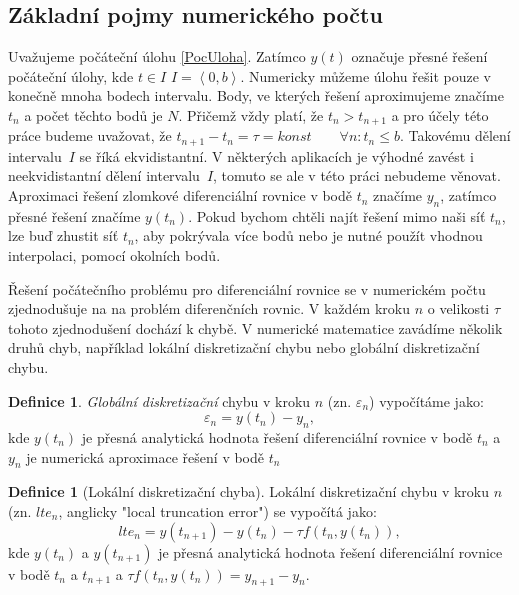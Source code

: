 \documentclass[a4paper,12pt,twoside]{article}
\theoremstyle{definition}
\newtheorem{defin}[veta]{Definice}
\theoremstyle{remark}
\numberwithin{equation}{section}
\numberwithin{table}{section}
\numberwithin{figure}{section}
\begin{document}
\subsection{Základní pojmy numerického počtu}
Uvažujeme počáteční úlohu \ref{PocUloha}. Zatímco $y\left(t\right)$ označuje přesné řešení počáteční úlohy, kde $t \in I$ $I = \left\langle0, b\right\rangle$. Numericky můžeme úlohu řešit pouze v konečně mnoha bodech intervalu. Body, ve kterých řešení aproximujeme značíme $t_n$ a počet těchto bodů je $N$. Přičemž vždy platí, že $t_n > t_{n+1}$ a pro účely této práce budeme uvažovat, že $t_{n+1} - t_n = \tau = konst \qquad \forall n: t_n \leq b$. Takovému dělení intervalu~$I$ se říká ekvidistantní. V některých aplikacích je výhodné zavést i neekvidistantní dělení intervalu~$I$, tomuto se ale v této práci nebudeme věnovat.
Aproximaci řešení zlomkové diferenciální rovnice v bodě $t_n$ značíme $y_n$, zatímco přesné řešení značíme $y\left(t_n\right)$. Pokud bychom chtěli najít řešení mimo naši síť $t_n$, lze buď zhustit síť $t_n$, aby pokrývala více bodů nebo je nutné použít vhodnou interpolaci, pomocí okolních bodů.

Řešení počátečního problému pro diferenciální rovnice se v numerickém počtu zjednodušuje na na problém diferenčních rovnic. V každém kroku $n$ o velikosti $\tau$ tohoto zjednodušení dochází k chybě. V numerické matematice zavádíme několik druhů chyb, například lokální diskretizační chybu nebo globální diskretizační chybu. %

\begin{defin}\label{GlobalniDiskretizacniChyba}
	\textit{Globální diskretizační} chybu v kroku $n$ (zn. $\varepsilon_{n}$) vypočítáme jako:
	$$\varepsilon_{n} = y\left(t_{n}\right) - y_{n},$$
	kde $y\left(t_{n}\right)$ je přesná analytická hodnota řešení diferenciální rovnice v bodě $t_{n}$ a $y_{n}$ je numerická aproximace řešení v bodě $t_{n}$
\end{defin}

\begin{defin} [Lokální diskretizační chyba]
	Lokální diskretizační chybu v kroku $n$ (zn. $lte_{n}$, anglicky "local truncation error") se vypočítá jako:
	$$lte_{n} = y\left(t_{n+1}\right) -y\left(t_{n}\right) - \tau f\left(t_{n}, y\left(t_{n}\right)\right),$$
	kde $y\left(t_{n}\right)$ a $y\left(t_{n+1}\right)$ je přesná analytická hodnota řešení diferenciální rovnice v bodě $t_{n}$ a $t_{n+1}$ a $\tau f\left(t_{n}, y\left(t_{n}\right)\right) = y_{n+1} - y_{n}$.
\end{defin}
\end{document}
